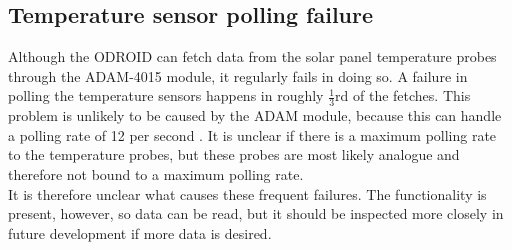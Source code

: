 \subsection{Temperature sensor polling failure}\label{sec:temperature_sensor_failure}
Although the ODROID can fetch data from the solar panel temperature probes through the ADAM-4015 module, it regularly fails in doing so. A failure in polling the temperature sensors happens in roughly $\frac{1}{3}$rd of the fetches. This problem is unlikely to be caused by the ADAM module, because this can handle a polling rate of 12 per second \cite{adam_polling}. It is unclear if there is a maximum polling rate to the temperature probes, but these probes are most likely analogue and therefore not bound to a maximum polling rate.\\

It is therefore unclear what causes these frequent failures. The functionality is present, however, so data can be read, but it should be inspected more closely in future development if more data is desired.
